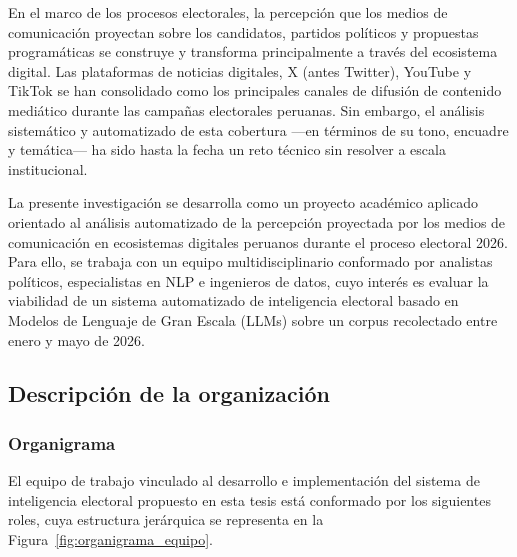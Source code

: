 En el marco de los procesos electorales, la percepción que los medios de comunicación proyectan sobre los candidatos, partidos políticos y propuestas programáticas se construye y transforma principalmente a través del ecosistema digital. Las plataformas de noticias digitales, X (antes Twitter), YouTube y TikTok se han consolidado como los principales canales de difusión de contenido mediático durante las campañas electorales peruanas. Sin embargo, el análisis sistemático y automatizado de esta cobertura —en términos de su tono, encuadre y temática— ha sido hasta la fecha un reto técnico sin resolver a escala institucional.

La presente investigación se desarrolla como un proyecto académico aplicado orientado al análisis automatizado de la percepción proyectada por los medios de comunicación en ecosistemas digitales peruanos durante el proceso electoral 2026. Para ello, se trabaja con un equipo multidisciplinario conformado por analistas políticos, especialistas en NLP e ingenieros de datos, cuyo interés es evaluar la viabilidad de un sistema automatizado de inteligencia electoral basado en Modelos de Lenguaje de Gran Escala (LLMs) sobre un corpus recolectado entre enero y mayo de 2026.

\subsection{Descripción de la organización}

\subsubsection{Organigrama}

El equipo de trabajo vinculado al desarrollo e implementación del sistema de inteligencia electoral propuesto en esta tesis está conformado por los siguientes roles, cuya estructura jerárquica se representa en la Figura~\ref{fig:organigrama_equipo}.


